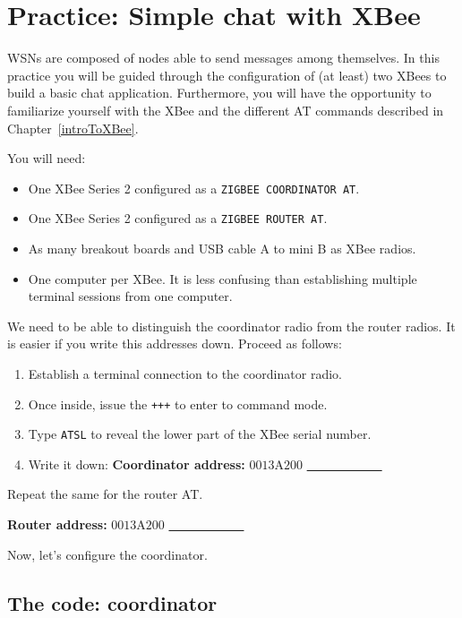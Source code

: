 \section{Practice: Simple chat with XBee}\label{pract:simpleChat}

WSNs are composed of nodes able to send messages among themselves. In this practice you will be guided through the configuration of (at least) two XBees to build a basic chat application. Furthermore, you will have the opportunity to familiarize yourself with the XBee and the different AT commands described in Chapter~\ref{introToXBee}.

You will need:

\begin{itemize}
	\item One XBee Series 2 configured as a \texttt{ZIGBEE COORDINATOR AT}.
	\item One XBee Series 2 configured as a \texttt{ZIGBEE ROUTER AT}.
	\item As many breakout boards and USB cable A to mini B as XBee radios.
	\item One computer per XBee. It is less confusing than establishing multiple terminal sessions from one computer.
\end{itemize}

We need to be able to distinguish the coordinator radio from the router radios. It is easier if you write this addresses down. Proceed as follows:

\begin{enumerate}
	\item Establish a terminal connection to the coordinator radio.
	\item Once inside, issue the \texttt{+++} to enter to command mode.
	\item Type \texttt{ATSL} to reveal the lower part of the XBee serial number.
	\item Write it down: {\bfseries Coordinator address:} $0013$A$200$ \underline{\ \ \ \ \ \ \ \ \ \ \ \ }
\end{enumerate}

Repeat the same for the router AT.

{\bfseries Router address:} $0013$A$200$ \underline{\ \ \ \ \ \ \ \ \ \ \ \ }

Now, let's configure the coordinator.

\subsection{The code: coordinator}

